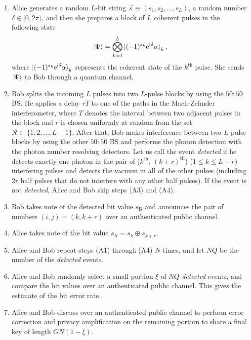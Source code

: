 \documentclass[twocolumn,superscriptaddress,pra,footinbib,notitlepage]{revtex4-1}
\newcommand{\1}{\mbox{1}\hspace{-0.25em}\mbox{l}}
\begin{document}
\begin{enumerate}[label=(A\arabic*)]
\setlength{\parskip}{0cm}
\setlength{\itemsep}{0cm}
\item Alice generates a random $L$-bit string $\vec{s}\equiv(s_1, s_2, \dots, s_L)$, a random number $\delta\in[0, 2\pi)$, and then she prepares a block of $L$ coherent pulses in the following state
\begin{align}
\ket{\Psi}=\bigotimes_{k=1}^L\ket{(-1)^{s_k}\mathrm{e}^{\mathrm{i}\delta}\alpha}_k,
\end{align}
where $\ket{(-1)^{s_k}\mathrm{e}^{\mathrm{i}\delta}\alpha}_k$ represents the coherent state of the $k^\mathrm{th}$ pulse.
She sends $\ket{\Psi}$ to Bob through a quantum channel.
\item Bob splits the incoming $L$ pulses into two $L$-pulse blocks by using the $50:50$ BS.
He applies a delay $rT$ to one of the paths in the Mach-Zehnder interferometer, where $T$ denotes the interval between two adjacent pulses in the block and $r$ is chosen uniformly at random from the set $\mathcal{R}\subset\{1, 2, \dots, L-1\}$.
After that, Bob makes interference between two $L$-pulse blocks by using the other $50:50$ BS and performs the photon detection with the photon number resolving detectors.
Let us call the event \textit{detected} if he detects exactly one photon in the pair of ($k^\mathrm{th}$, $(k+r)^\mathrm{th}$) ($1\leq k\leq L-r$) interfering pulses and detects the vacuum in all of the other pulses (including $2r$ half pulses that do not interfere with any other half pulses). If the event is not \textit{detected}, Alice and Bob skip steps (A3) and (A4).
\item Bob takes note of the detected bit value $s_\textrm{B}$ and announces the pair of numbers $(i, j)=(k, k+r)$ over an authenticated public channel.
\item Alice takes note of the bit value $s_\mathrm{A}=s_k\oplus s_{k+r}$.
\item Alice and Bob repeat steps (A1) through (A4) $N$ times, and let $NQ$ be the number of the \textit{detected} events. %
\item Alice and Bob randomly select a small portion $\xi$ of $NQ$ \textit{detected} events, and compare the bit values over an authenticated public channel. This gives the estimate of the bit error rate. %
\item Alice and Bob discuss over an authenticated public channel to perform error correction and privacy amplification on the remaining portion to share a final key of length $GN(1-\xi)$.
\end{enumerate}
\end{document}
